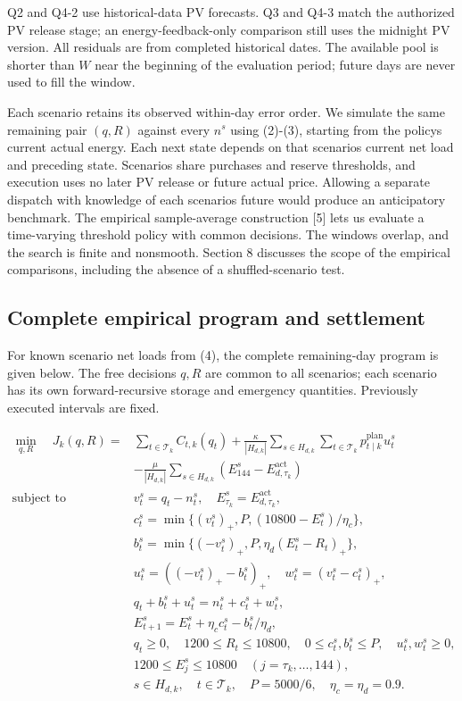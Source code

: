 Q2 and Q4-2 use historical-data PV forecasts. Q3 and Q4-3 match the authorized PV release stage; an energy-feedback-only comparison still uses the midnight PV version. All residuals are from completed historical dates. The available pool is shorter than \(W\) near the beginning of the evaluation period; future days are never used to fill the window.

Each scenario retains its observed within-day error order. We simulate the same remaining pair \((q,R)\) against every \(n^s\) using (2)-(3), starting from the policy\textquotesingle s current actual energy. Each next state depends on that scenario\textquotesingle s current net load and preceding state. Scenarios share purchases and reserve thresholds, and execution uses no later PV release or future actual price. Allowing a separate dispatch with knowledge of each scenario\textquotesingle s future would produce an anticipatory benchmark. The empirical sample-average construction {[}5{]} lets us evaluate a time-varying threshold policy with common decisions. The windows overlap, and the search is finite and nonsmooth. Section 8 discusses the scope of the empirical comparisons, including the absence of a shuffled-scenario test.

\Needspace{100pt}

\subsection{Complete empirical program and settlement}\label{complete-empirical-program-and-settlement}


For known scenario net loads from (4), the complete remaining-day program is given below. The free decisions \(q,R\) are common to all scenarios; each scenario has its own forward-recursive storage and emergency quantities. Previously executed intervals are fixed.

\[
\begin{aligned}
\min_{q,R}\quad J_k(q,R)={}
 &\sum_{t\in\mathcal T_k}C_{t,k}(q_t)
 +\frac{\kappa}{|H_{d,k}|}\sum_{s\in H_{d,k}}\sum_{t\in\mathcal T_k}p^{\mathrm{plan}}_{t\mid k}u_t^s
\\
 &-\frac{\mu}{|H_{d,k}|}\sum_{s\in H_{d,k}}(E_{144}^s-E^{\mathrm{act}}_{d,\tau_k})\\
\text{subject to}\quad
 &v_t^s=q_t-n_t^s,\quad E_{\tau_k}^s=E^{\mathrm{act}}_{d,\tau_k},\\
 &c_t^s=\min\{(v_t^s)_+,P,(10800-E_t^s)/\eta_c\},\\
 &b_t^s=\min\{(-v_t^s)_+,P,\eta_d(E_t^s-R_t)_+\},\\
 &u_t^s=((-v_t^s)_+-b_t^s)_+,\quad w_t^s=(v_t^s-c_t^s)_+,\\
 &q_t+b_t^s+u_t^s=n_t^s+c_t^s+w_t^s,\\
 &E_{t+1}^s=E_t^s+\eta_c c_t^s-b_t^s/\eta_d,\\
 &q_t\ge0,\quad1200\le R_t\le10800,\quad0\le c_t^s,b_t^s\le P,\quad u_t^s,w_t^s\ge0,\\
 &1200\le E_j^s\le10800\quad(j=\tau_k,\ldots,144),\\
 &s\in H_{d,k},\quad t\in\mathcal T_k,\quad P=5000/6,\quad\eta_c=\eta_d=0.9.
\end{aligned} \tag{5}
\]

